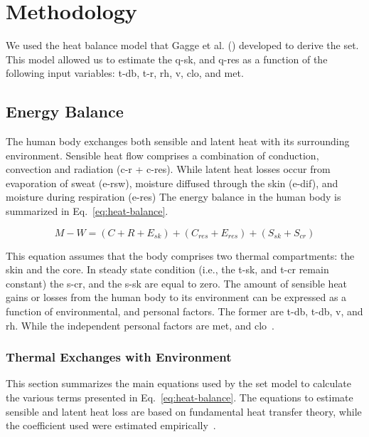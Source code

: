 
\section{Methodology}\label{sec:methodology}

We used the heat balance model that Gagge et al. (\citeyear{GaggeSET}) developed to derive the \ac{set}.
This model allowed us to estimate the \ac{q-sk}, and \ac{q-res} as a function of the following input variables: \ac{t-db}, \ac{t-r}, \ac{rh}, \ac{v}, \ac{clo}, and \ac{met}.

\subsection{Energy Balance}\label{subsec:energy-balance}

The human body exchanges both sensible and latent heat with its surrounding environment.
Sensible heat flow comprises a combination of conduction, convection and radiation (\acs{c-r} + \acs{c-res}).
While latent heat losses occur from evaporation of sweat  (\acs{e-rsw}), moisture diffused through the skin  (\acs{e-dif}), and moisture during respiration (\acs{e-res})
The energy balance in the human body is summarized in Eq.~\ref{eq:heat-balance}.

\begin{equation}
    M - W = (C + R + E_{sk}) + (C_{res} + E_{res}) + (S_{sk} + S_{cr})\label{eq:heat-balance}
\end{equation}

This equation assumes that the body comprises two thermal compartments: the skin and the core.
In steady state condition (i.e., the \ac{t-sk}, and \ac{t-cr} remain constant) the \ac{s-cr}, and the \ac{s-sk} are equal to zero.
The amount of sensible heat gains or losses from the human body to its environment can be expressed as a function of environmental, and personal factors.
The former are \ac{t-db}, \ac{t-db}, \ac{v}, and \ac{rh}.
While the independent personal factors are \ac{met}, and \ac{clo}~\cite{ASHRA2017}.

\subsubsection{Thermal Exchanges with Environment}\label{subsubsec:thermal-exchanges-with-environment}

This section summarizes the main equations used by the \ac{set} model to calculate the various terms presented in Eq.~\ref{eq:heat-balance}.
The equations to estimate sensible and latent heat loss are based on fundamental heat transfer theory, while the coefficient used were estimated empirically~\cite{ASHRA2017}.

